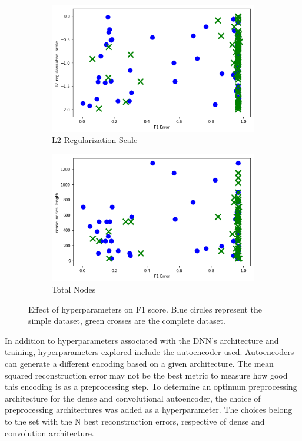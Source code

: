 \begin{figure}[H]
    \begin{subfigure}[b]{0.49\textwidth}
         \centering
         \includegraphics[width=\textwidth]{images/l2_reg_dummy.png}
         \caption{L2 Regularization Scale}
         \label{fig:L2_scale_learning}
     \end{subfigure}
     \hfill
     \begin{subfigure}[b]{0.49\textwidth}
         \centering
         \includegraphics[width=\textwidth]{images/dense_nodes_total_dummy.png}
         \caption{Total Nodes}
         \label{fig:total_nodes_learning}
     \end{subfigure}     
        \caption{Effect of hyperparameters on F1 score. Blue circles represent the simple dataset, green crosses are the complete dataset.}
        \label{fig:dense_hyperparameters_f1_score}
\end{figure}


In addition to hyperparameters associated with the DNN's architecture and training, hyperparameters explored include the autoencoder used. Autoencoders can generate a different encoding based on a given architecture. The mean squared reconstruction error may not be the best metric to measure how good this encoding is as a preprocessing step. To determine an optimum preprocessing architecture for the dense and convolutional autoencoder, the choice of preprocessing architectures was added as a hyperparameter. The choices belong to the set with the N best reconstruction errors, respective of dense and convolution architecture.

